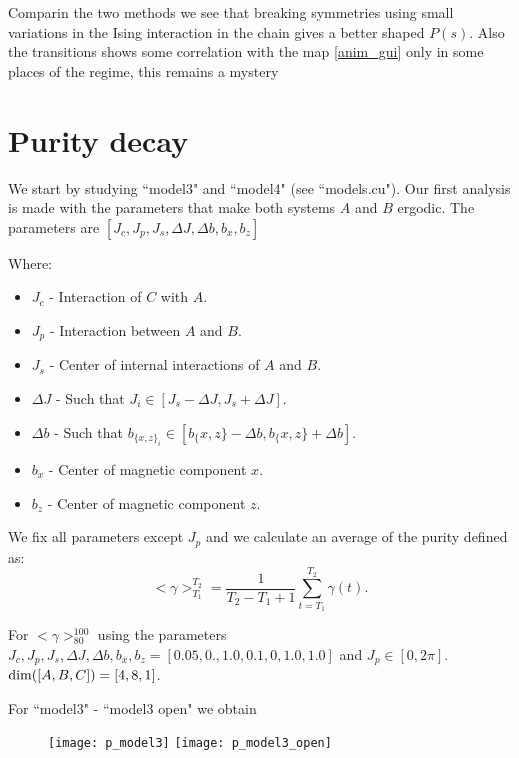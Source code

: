 \documentclass[floatfix]{article}
\newcommand*{\ud}{
\underline{\space\space}}
\begin{document}
Comparin the two methods we see that breaking symmetries using small variations in the Ising interaction in the chain gives
a better shaped $P(s)$. Also the transitions shows some correlation with the map \ref{anim_gui} only in some places of the
regime, this remains a mystery


\section{Purity decay}

We start by studying ``model3" and ``model4" (see ``models.cu"). Our first analysis is made with the parameters that make 
both systems $A$ and $B$ ergodic. The parameters are $[J_c,J_p,J_s,\Delta J,\Delta b, b_x, b_z]$

Where:
\begin{itemize}
\item $J_c$ - Interaction of $C$ with $A$.
\item $J_p$ - Interaction between $A$ and $B$.
\item $J_s$ - Center of internal interactions of $A$ and $B$.
\item $\Delta J$ - Such that $J_i \in [J_s - \Delta J, J_s + \Delta J]$.
\item $\Delta b$ - Such that $b_{{\{x,z\}}_i} \in [b_\{x,z\} - \Delta b, b_\{x,z\} + \Delta b]$.
\item $b_x$ - Center of magnetic component $x$.
\item $b_z$ - Center of magnetic component $z$. 
\end{itemize}

We fix all parameters except $J_p$ and we calculate an average of the purity defined as:
\begin{equation}
<\gamma>_{T_1}^{T_2} = \frac{1}{T_2-T_1+1} \sum_{t=T_1}^{T_2} \gamma(t).
\end{equation}

For $<\gamma>_{80}^{100}$ using the parameters $J_c,J_p,J_s,\Delta J,\Delta b,b_x,b_z=[0.05,0.,1.0,0.1,0,1.0,1.0] $ 
and $J_p \in [0,2\pi]$. ${\rm dim}([A,B,C])=[4,8,1]$.

For ``model3" - ``model3\ud open" we obtain

\begin{figure}[H]
\begin{center}
\texttt{[image: p\_model3]}  
\texttt{[image: p\_model3\_open]}  
\end{center}
\caption{}
\label{p_m3}
\end{figure}
\end{document}
